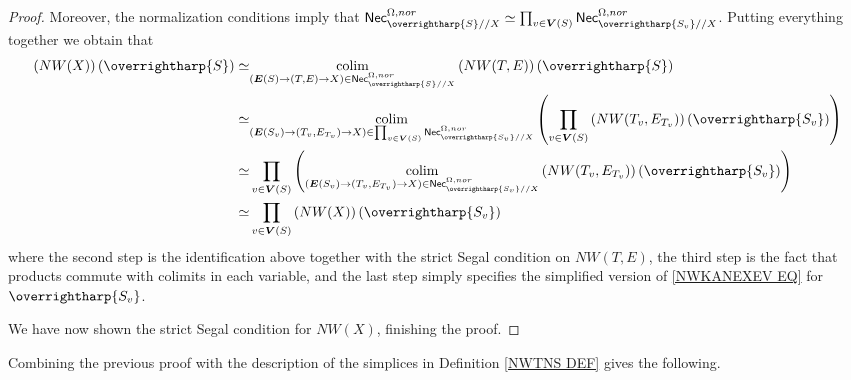 \documentclass[a4paper,10pt
,draft
]{article}%
\numberwithin{equation}{section}
\numberwithin{figure}{section}
\theoremstyle{definition} %
\newcommand{\vect}[1]{\text{\overrightharp{\ensuremath{#1}}}}
\DeclareMathOperator{\colim}{colim}%
\newcommand{\1}{\ensuremath{\mathbbm 1}}%
\begin{document}
\begin{proof}
Moreover, the normalization conditions imply that
$\mathsf{Nec}_{\vect{S}//X}^{\Omega,nor} 
\simeq
\prod_{v \in \boldsymbol{V}(S)}
\mathsf{Nec}_{\vect{S_v}//X}^{\Omega,nor}$.
Putting everything together we obtain that
\begin{equation}
\begin{aligned}
\left(NW(X)\right)(\vect{S}) 
	\simeq &
	\underset{(\boldsymbol{E}(S) \to (T,E) \to X)
	\in \mathsf{Nec}^{\Omega,nor}_{\vect{S}//X}}{\colim}
\left(NW(T,E)\right)(\vect{S})
\\
	\simeq &
\underset{(\boldsymbol{E}(S_v) \to (T_v,E_{T_v}) \to X)
	\in 
	\prod_{v \in \boldsymbol{V}(S)} \mathsf{Nec}^{\Omega,nor}_{\vect{S_v}//X}}{\colim}
	\left(\prod_{v \in \boldsymbol{V}(S)}
	\left(NW(T_v,E_{T_v})\right)(\vect{S_v})\right)
\\
	\simeq &
	\prod_{v \in \boldsymbol{V}(S)}
	\left(
	\underset{(\boldsymbol{E}(S_v) \to (T_v,E_{T_v}) \to X)
	\in \mathsf{Nec}^{\Omega,nor}_{\vect{S_v}//X}}{\colim}
	\left(NW(T_v,E_{T_v})\right)(\vect{S_v})
	\right)
\\
	\simeq &
	\prod_{v \in \boldsymbol{V}(S)} 
	\left(NW(X)\right)(\vect{S_v}) 
\end{aligned}
\end{equation}
where the second step is the identification above together with 
the strict Segal condition on 
$NW(T,E)$,
the third step is the fact that products commute with colimits in each variable, and the last step simply specifies
the simplified version of \eqref{NWKANEXEV EQ}
for $\vect{S_v}$.

We have now shown the 
strict Segal condition for $NW(X)$, 
finishing the proof.
\end{proof}


Combining the previous proof with the description of the simplices 
in Definition \ref{NWTNS DEF} gives the following.
\end{document}
